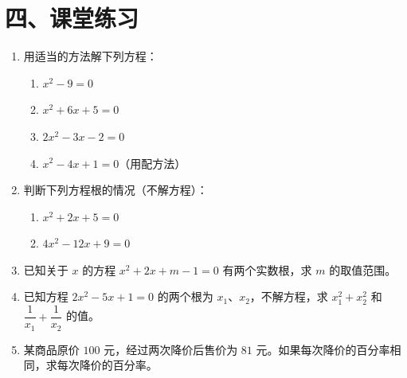 \documentclass[12pt, a4paper]{ctexart}
\begin{document}
\section*{\textcolor{tipgreen}{四、课堂练习}}

\begin{enumerate}[leftmargin=*, label=\textbf{\arabic*.}]
  \item 用适当的方法解下列方程：
  \begin{enumerate}[label=(\arabic*)]
    \item $x^2 - 9 = 0$
    \item $x^2 + 6x + 5 = 0$
    \item $2x^2 - 3x - 2 = 0$
    \item $x^2 - 4x + 1 = 0$（用配方法）
  \end{enumerate}

  \item 判断下列方程根的情况（不解方程）：
  \begin{enumerate}[label=(\arabic*)]
    \item $x^2 + 2x + 5 = 0$
    \item $4x^2 - 12x + 9 = 0$
  \end{enumerate}

  \item 已知关于 $x$ 的方程 $x^2 + 2x + m - 1 = 0$ 有两个实数根，求 $m$ 的取值范围。

  \item 已知方程 $2x^2-5x+1=0$ 的两个根为 $x_1$、$x_2$，不解方程，求 $x_1^2+x_2^2$ 和 $\dfrac{1}{x_1}+\dfrac{1}{x_2}$ 的值。

  \item 某商品原价 $100$ 元，经过两次降价后售价为 $81$ 元。如果每次降价的百分率相同，求每次降价的百分率。
\end{enumerate}
\end{document}
